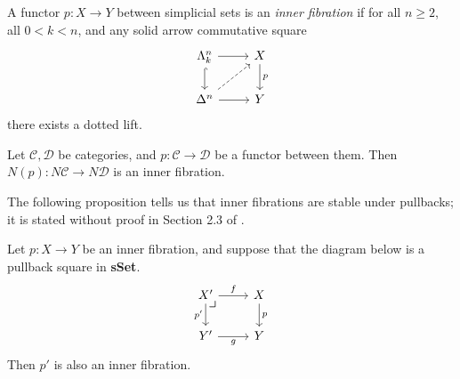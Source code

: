 \documentclass{MetricNotes2023}
\begin{document}
\begin{definition}
A functor \(p : X \to Y\) between simplicial sets is an \textit{inner fibration} if for all \(n \geq 2\), all \(0 < k < n\), and any solid arrow commutative square 
\[\begin{tikzcd}
\Lambda^n_k \arrow[r, ""] \arrow[d, hookrightarrow, swap, ""]  & X \arrow[d, "p"]  \\
\Delta^n \arrow[r, swap, ""] \arrow[ur, dashrightarrow, swap, ""]  & Y
\end{tikzcd}\]
there exists a dotted lift. 
\end{definition}

\begin{example}\label{ex:inner}
Let \(\mathcal{C}, \mathcal{D}\) be categories, and \(p : \mathcal{C} \to \mathcal{D}\) be a functor between them. Then \(N(p) : N \mathcal{C} \to N \mathcal{D}\) is an inner fibration.
\end{example}

The following proposition tells us that inner fibrations are stable under pullbacks; it is stated without proof in Section 2.3 of \autocite{lurie2008higher}.

\begin{proposition}\label{pullback}
Let \(p : X \to Y\) be an inner fibration, and suppose that the diagram below is a pullback square in \textbf{sSet}.
\[\begin{tikzcd}
X' \arrow[r, "f"] \arrow[d, swap, "p'"] \arrow[dr, phantom, "\scalebox{1.3}{$\lrcorner$}" {xshift=-16pt, yshift=10pt}] & X \arrow[d, "p"]  \\
Y' \arrow[r, swap, "g"]  & Y
\end{tikzcd}\]
Then \(p'\) is also an inner fibration. 
\end{proposition}
\end{document}
